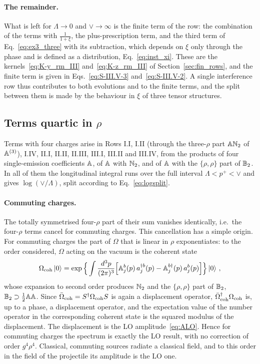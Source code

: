 \paragraph{The remainder.} What is left for $\Lambda\to0$ and $\vee\to\infty$ is the finite term of the row: the combination of the terms with $\frac{1}{1+\xi}$, the plus-prescription term, and the third term of Eq.~\eqref{eq:ex3_three} with its subtraction, which depends on $\xi$ only through the phase and is defined as a distribution, Eq.~\eqref{eq:inst_xi}. These are the kernels~\eqref{eq:K-y_rm_III} and~\eqref{eq:K-z_rm_III} of Section~\ref{sec:fin_rows}, and the finite term is given in Eqs.~\eqref{eq:S-III.V-3} and~\eqref{eq:S-III.V-2}. A single interference row thus contributes to both evolutions and to the finite terms, and the split between them is made by the behaviour in $\xi$ of three tensor structures.

\subsection{Terms quartic in \texorpdfstring{$\rho$}{rho}}\label{sec:fourrho}

Terms with four charges arise in Rows I.I, I.II (through the three-$\rho$ part $\mathbb{A}\mathbb{N}_2$ of $\mathbb{A}^{(3)}$), I.IV, II.I, II.II, II.III, III.I, III.II and III.IV, from the products of four single-emission coefficients $\mathbb{A}$, of $\mathbb{A}$ with $\mathbb{N}_2$, and of $\mathbb{A}$ with the $\{\rho,\rho\}$ part of $\mathbb{B}_2$. In all of them the longitudinal integral runs over the full interval $\Lambda<p^+<\vee$ and gives $\log(\vee/\Lambda)$, split according to Eq.~\eqref{eq:logsplit}.

\paragraph{Commuting charges.} The totally symmetrised four-$\rho$ part of their sum vanishes identically, i.e.\ the four-$\rho$ terms cancel for commuting charges. This cancellation has a simple origin. For commuting charges the part of $\Omega$ that is linear in $\rho$ exponentiates: to the order considered, $\Omega$ acting on the vacuum is the coherent state
\begin{align}\label{eq:coherent}
\Omega_{\rm coh}\ket0=\exp\Big\{\int\frac{d^3p}{(2\pi)^3}\Big[\mathbb{A}^b_j(p)\,a^{\dagger b}_j(p)-\mathbb{A}^{b\dagger}_j(p)\,a^b_j(p)\Big]\Big\}\ket0\,,
\end{align}
whose expansion to second order produces $\mathbb{N}_2$ and the $\{\rho,\rho\}$ part of $\mathbb{B}_2$, $\mathbb{B}_2\supset\frac12\mathbb{A}\mathbb{A}$. Since $\bar\Omega_{\rm coh}=S^\dagger\Omega_{\rm coh}S$ is again a displacement operator, $\bar\Omega^\dagger_{\rm coh}\Omega_{\rm coh}$ is, up to a phase, a displacement operator, and the expectation value of the number operator in the corresponding coherent state is the squared modulus of the displacement. The displacement is the LO amplitude~\eqref{eq:ALO}. Hence for commuting charges the spectrum is exactly the LO result, with no correction of order $g^4\rho^4$. Classical, commuting sources radiate a classical field, and to this order in the field of the projectile its amplitude is the LO one.


